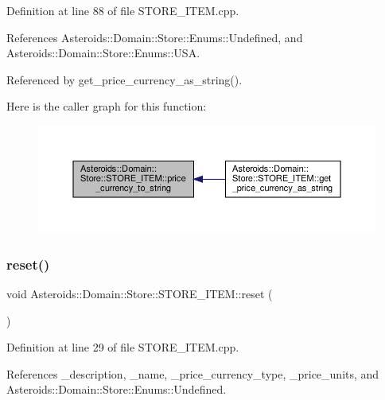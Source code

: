 Definition at line 88 of file S\+T\+O\+R\+E\+\_\+\+I\+T\+E\+M.\+cpp.



References Asteroids\+::\+Domain\+::\+Store\+::\+Enums\+::\+Undefined, and Asteroids\+::\+Domain\+::\+Store\+::\+Enums\+::\+U\+SA.



Referenced by get\+\_\+price\+\_\+currency\+\_\+as\+\_\+string().

Here is the caller graph for this function\+:\nopagebreak
\begin{figure}[H]
\begin{center}
\leavevmode
\includegraphics[width=350pt]{classAsteroids_1_1Domain_1_1Store_1_1STORE__ITEM_a1d0710f3057bb6f2b3b62414d32ab3b2_icgraph}
\end{center}
\end{figure}
\mbox{\label{classAsteroids_1_1Domain_1_1Store_1_1STORE__ITEM_a7e148d3efb06f96983ec8adfe2eb3e22}} 
\subsubsection{\texorpdfstring{reset()}{reset()}}
{\footnotesize\ttfamily void Asteroids\+::\+Domain\+::\+Store\+::\+S\+T\+O\+R\+E\+\_\+\+I\+T\+E\+M\+::reset (\begin{DoxyParamCaption}{ }\end{DoxyParamCaption})}



Definition at line 29 of file S\+T\+O\+R\+E\+\_\+\+I\+T\+E\+M.\+cpp.



References \+\_\+description, \+\_\+name, \+\_\+price\+\_\+currency\+\_\+type, \+\_\+price\+\_\+units, and Asteroids\+::\+Domain\+::\+Store\+::\+Enums\+::\+Undefined.



